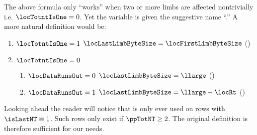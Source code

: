 The above formula only ``works'' when two or more limbs are affected nontrivially i.e. $\locTotntIsOne = 0$.
Yet the variable is given the suggestive name ``\locLastLimbByteSize.''
A more natural definition would be:
\begin{enumerate}
	\item \If $\locTotntIsOne = 1$ \Then $\locLastLimbByteSize = \locFirstLimbByteSize$ (\trash)
	\item \If $\locTotntIsOne = 0$ \Then
		\begin{enumerate}
			\item \If $\locDataRunsOut = 0$ \Then $\locLastLimbByteSize = \llarge$ (\trash)
			\item \If $\locDataRunsOut = 1$ \Then $\locLastLimbByteSize = \llarge - \locRt$ (\trash)
		\end{enumerate}
\end{enumerate}
Looking ahead the reader will notice that \locLastLimbByteSize{} is only ever used on rows with $\isLastNT \equiv 1$.
Such rows only exist if $\ppTotNT \geq 2$.
The original definition is therefore sufficient for our needs. 
